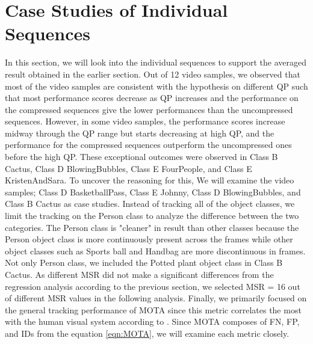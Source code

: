 \section{Case Studies of Individual Sequences}
\label{sec:results/section_b}

In this section, we will look into the individual sequences to support the averaged result obtained in the earlier section. Out of 12 video samples, we observed that most of the video samples are consistent with the hypothesis on different QP such that most performance scores decrease as QP increases and the performance on the compressed sequences give the lower performances than the uncompressed sequences. However, in some video samples, the performance scores increase midway through the QP range but starts decreasing at high QP, and the performance for the compressed sequences outperform the uncompressed ones before the high QP. These exceptional outcomes were observed in Class B Cactus, Class D BlowingBubbles, Class E FourPeople, and Class E KristenAndSara. To uncover the reasoning for this, We will examine the video samples; Class D BasketballPass, Class E Johnny, Class D BlowingBubbles, and Class B Cactus as case studies. Instead of tracking all of the object classes, we limit the tracking on the Person class to analyze the difference between the two categories. The Person class is "cleaner" in result than other classes because the Person object class is more continuously present across the frames while other object classes such as Sports ball and Handbag are more discontinuous in frames. Not only Person class, we included the Potted plant object class in Class B Cactus. As different MSR did not make a significant differences from the regression analysis according to the previous section, we selected MSR = 16 out of different MSR values in the following analysis. Finally, we primarily focused on the general tracking performance of MOTA since this metric correlates the most with the human visual system according to \cite{leal-taixe_motchallenge_2015}. Since MOTA composes of FN, FP, and IDs from the equation \ref{eqn:MOTA}, we will examine each metric closely.  


